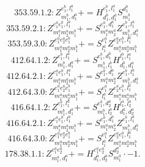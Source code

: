 \documentclass[letterpaper,10pt,fleqn,leqno,onecolumn]{article}
\begin{document}
\begin{equation} \;\;\;\;\;\;  353.59.1.2: Z^{e_{1}^{b},l_{1}^{a}}_{m_{1}^{b},d_{1}^{a}}+=H^{e_{1}^{b},l_{1}^{a}}_{d_{1}^{b},d_{1}^{a}}S^{d_{1}^{b}}_{m_{1}^{b}} \end{equation}
\begin{equation} \;\;\;\;\;\;  353.59.2.1: Z^{e_{1}^{a}e_{1}^{b},l_{1}^{a}}_{m_{1}^{a}m_{2}^{a}m_{1}^{b}}+=S^{e_{1}^{a},d_{1}^{a}}_{m_{1}^{a}m_{2}^{a}}Z^{e_{1}^{b},l_{1}^{a}}_{m_{1}^{b},d_{1}^{a}} \end{equation}
\begin{equation} \;\;\;\;\;\;  353.59.3.0: Z^{e_{1}^{a}e_{2}^{a}e_{1}^{b}}_{m_{1}^{a}m_{2}^{a}m_{1}^{b}}+=S^{e_{1}^{a}}_{l_{1}^{a}}Z^{e_{2}^{a}e_{1}^{b},l_{1}^{a}}_{m_{1}^{a}m_{2}^{a}m_{1}^{b}} \end{equation}
\begin{equation} \;\;\;\;\;\;  412.64.1.2: Z^{e_{1}^{b},l_{1}^{a}}_{m_{1}^{b},d_{1}^{a}}+=S^{e_{1}^{b},d_{1}^{b}}_{m_{1}^{b},l_{1}^{b}}H^{l_{1}^{b},l_{1}^{a}}_{d_{1}^{b},d_{1}^{a}} \end{equation}
\begin{equation} \;\;\;\;\;\;  412.64.2.1: Z^{e_{1}^{a}e_{1}^{b},l_{1}^{a}}_{m_{1}^{a}m_{2}^{a}m_{1}^{b}}+=S^{e_{1}^{a},d_{1}^{a}}_{m_{1}^{a}m_{2}^{a}}Z^{e_{1}^{b},l_{1}^{a}}_{m_{1}^{b},d_{1}^{a}} \end{equation}
\begin{equation} \;\;\;\;\;\;  412.64.3.0: Z^{e_{1}^{a}e_{2}^{a}e_{1}^{b}}_{m_{1}^{a}m_{2}^{a}m_{1}^{b}}+=S^{e_{1}^{a}}_{l_{1}^{a}}Z^{e_{2}^{a}e_{1}^{b},l_{1}^{a}}_{m_{1}^{a}m_{2}^{a}m_{1}^{b}} \end{equation}
\begin{equation} \;\;\;\;\;\;  416.64.1.2: Z^{e_{1}^{b},l_{1}^{a}}_{m_{1}^{b},d_{1}^{a}}+=S^{e_{1}^{b},d_{2}^{a}}_{m_{1}^{b},l_{2}^{a}}H^{l_{1}^{a},l_{2}^{a}}_{d_{1}^{a},d_{2}^{a}} \end{equation}
\begin{equation} \;\;\;\;\;\;  416.64.2.1: Z^{e_{1}^{a}e_{1}^{b},l_{1}^{a}}_{m_{1}^{a}m_{2}^{a}m_{1}^{b}}+=S^{e_{1}^{a},d_{1}^{a}}_{m_{1}^{a}m_{2}^{a}}Z^{e_{1}^{b},l_{1}^{a}}_{m_{1}^{b},d_{1}^{a}} \end{equation}
\begin{equation} \;\;\;\;\;\;  416.64.3.0: Z^{e_{1}^{a}e_{2}^{a}e_{1}^{b}}_{m_{1}^{a}m_{2}^{a}m_{1}^{b}}+=S^{e_{1}^{a}}_{l_{1}^{a}}Z^{e_{2}^{a}e_{1}^{b},l_{1}^{a}}_{m_{1}^{a}m_{2}^{a}m_{1}^{b}} \end{equation}
\begin{equation} \;\;\;\;\;\;  178.38.1.1: Z^{e_{1}^{a}e_{2}^{a}}_{m_{1}^{a},d_{1}^{a}}+=H^{e_{1}^{a}e_{2}^{a}}_{d_{1}^{a},d_{2}^{a}}S^{d_{2}^{a}}_{m_{1}^{a}}\cdot -1. \end{equation}
\end{document}
